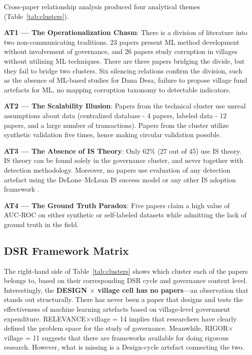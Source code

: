\documentclass[3p,times,procedia]{elsarticle}
\begin{document}
Cross-paper relationship analysis produced four analytical themes (Table~\ref{tab:clusters}).

\textbf{AT1 --- The Operationalization Chasm}: There is a division of literature into two non-communicating traditions. 23 papers present ML method development without involvement of governance, and 26 papers study corruption in villages without utilizing ML techniques. There are three papers bridging the divide, but they fail to bridge two clusters. Six silencing relations confirm the division, such as the absence of ML-based studies for Dana Desa, failure to propose village fund artefacts for ML, no mapping corruption taxonomy to detectable indicators.

\textbf{AT2 --- The Scalability Illusion}: Papers from the technical cluster use unreal assumptions about data (centralized database - 4 papers, labeled data - 12 papers, and a large number of transactions). Papers from the cluster utilize synthetic validation five times, hence making circular validation possible.

\textbf{AT3 --- The Absence of IS Theory}: Only 62\% (27 out of 45) use IS theory. IS theory can be found solely in the governance cluster, and never together with detection methodology. Moreover, no papers use evaluation of any detection artefact using the DeLone–McLean IS success model or any other IS adoption framework \cite{method_delone2003}.

\textbf{AT4 --- The Ground Truth Paradox}: Five papers claim a high value of AUC-ROC on either synthetic or self-labeled datasets while admitting the lack of ground truth in the field.

\subsection{DSR Framework Matrix}

The right-hand side of Table~\ref{tab:clusters} shows which cluster each of the papers belongs to, based on their corresponding DSR cycle and governance context level. Interestingly, the \textbf{DESIGN $\times$ village cell has no papers}—an observation that stands out structurally. There has never been a paper that designs and tests the effectiveness of machine learning artefacts based on village-level government expenditure. RELEVANCE$\times$village = 14 implies that researchers have clearly defined the problem space for the study of governance. Meanwhile, RIGOR$\times$village = 11 suggests that there are frameworks available for doing rigorous research. However, what is missing is a Design-cycle artefact connecting the two.
\end{document}
